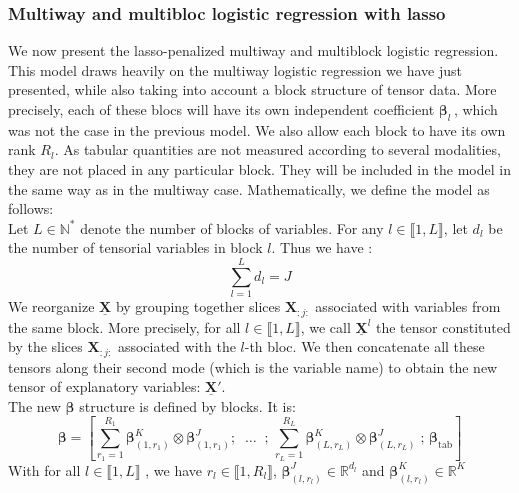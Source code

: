 \documentclass[preprint,12pt]{elsarticle}
\begin{document}
\subsubsection{Multiway and multibloc logistic regression with lasso}

We now present the lasso-penalized multiway and multiblock logistic regression. This model draws heavily on the multiway logistic regression we have just presented, while also taking into account a block structure of tensor data. More precisely, each of these blocs will have its own independent coefficient $\bm{\beta}_l \,$, which was not the case in the previous model. We also allow each block to have its own rank $R_l$. As tabular quantities are not measured according to several modalities, they are not placed in any particular block. They will be included in the model in the same way as in the multiway case. Mathematically, we define the model as follows:\\
\indent Let $L \in \mathbb{N}^{*}$ denote the number of blocks of variables. For any $l \in \llbracket 1, L \rrbracket$, let $d_l$ be the number of tensorial variables in block $l$. Thus we have :
$$\sum\limits_{l = 1}^L d_l = J$$
\indent We reorganize $\underline{\mathbf{X}}$ by grouping together slices $\mathbf{X}_{:j:}$ associated with variables from the same block. More precisely, for all $l \in \llbracket 1, L \rrbracket$, we call  $\underline{\mathbf{X}}^{l}$  the tensor constituted by the slices $\mathbf{X}_{:j:}$ associated with the $l$-th bloc. We then concatenate all these tensors along their second mode (which is the variable name) to obtain the new tensor of explanatory variables: $\underline{\mathbf{X}}'$.\\[5 pt]
\indent The new $\bm{\beta}$ structure is defined by blocks. It is:
\begin{equation}
    \bm{\beta} = \left[ \sum\limits_{r_1 = 1}^{R_1} \bm{\beta}_{(1,r_1)}^K \otimes \bm{\beta}_{(1,r_1)}^J;   \; \; \hdots  \; \; ;\, \sum\limits_{r_L = 1}^{R_L}\bm{\beta}_{(L,r_L)}^K \otimes \bm{\beta}_{(L,r_L)}^J\; ;\,\bm{\beta}_{\text{tab}}   \right]
\end{equation}
With for all $l \in \llbracket 1,L \rrbracket$ , we have $r_l \in \llbracket 1, R_l\rrbracket$,  $\bm{\beta}_{(l,r_l)}^J \in \mathbb{R}^{d_l}$ and $\bm{\beta}_{(l,r_l)}^K \in \mathbb{R}^{K}$  \\
\end{document}
